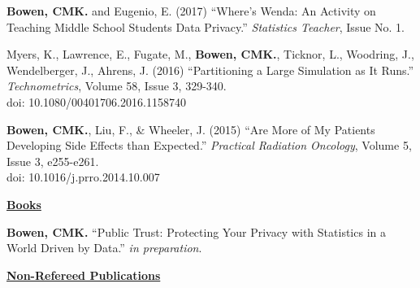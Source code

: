 \documentclass[11.5pt, letterpaper, roman]{moderncv} %
\begin{document}
\begin{etaremune}[topsep=0pt, itemsep=8pt, partopsep=0pt, parsep=0pt]
    \item \textbf{Bowen, CMK.} and Eugenio, E. (2017) ``Where's Wenda:  An Activity on Teaching Middle School Students Data Privacy.'' \textit{Statistics Teacher}, Issue No. 1.
    
    \item Myers, K., Lawrence, E., Fugate, M., \textbf{Bowen, CMK.}, Ticknor, L., Woodring, J., Wendelberger, J., Ahrens, J. (2016) ``Partitioning a Large Simulation as It Runs.'' \textit{Technometrics}, Volume 58, Issue 3, 329-340. \\
    doi: 10.1080/00401706.2016.1158740

    \item \textbf{Bowen, CMK.}, Liu, F., \& Wheeler, J. (2015) ``Are More of My Patients Developing Side Effects than Expected.'' \textit{Practical Radiation Oncology}, Volume 5, Issue 3, e255-e261.\\
    doi: 10.1016/j.prro.2014.10.007
    
\end{etaremune}

\vspace{8pt}
\noindent\underline{\textbf{Books}}

\begin{etaremune}[topsep=0pt, itemsep=8pt, partopsep=0pt, parsep=0pt]
  \item \textbf{Bowen, CMK.} ``Public Trust: Protecting Your Privacy with Statistics in a World Driven by Data.'' \textit{in preparation}.
\end{etaremune}

\vspace{8pt}
\noindent\underline{\textbf{Non-Refereed Publications}}
\end{document}
